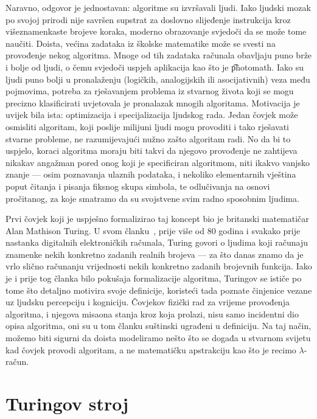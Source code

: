 Naravno, odgovor je jednostavan: algoritme su izvršavali ljudi. Iako ljudski mozak po svojoj prirodi nije savršen supstrat za doslovno slijeđenje instrukcija kroz višeznamenkaste brojeve koraka, moderno obrazovanje svjedoči da se može tome na\-u\-či\-ti. Doista, većina zadataka iz školske matematike može se svesti na provođenje nekog algoritma. Mnoge od tih zadataka računala obavljaju puno brže i bolje od ljudi, o čemu svjedoči uspjeh aplikacija kao što je \t{photomath}. Iako su ljudi puno bolji u pronalaženju (logičkih, analogijskih ili asocijativnih) veza među pojmovima, potreba za rješavanjem problema iz stvarnog života koji se mogu precizno klasificirati uvjetovala je pronalazak mnogih algoritama. Motivacija je uvijek bila ista: optimizacija i specijalizacija ljudskog rada. Jedan čovjek može osmisliti algoritam, koji poslije milijuni ljudi mogu provoditi i tako rješavati stvarne probleme, ne razumijevajući nužno zašto algoritam radi. No da bi to uspjelo, koraci algoritma moraju biti takvi da njegovo provođenje ne zahtijeva nikakav angažman pored onog koji je specificiran algoritmom, niti ikakvo vanjsko znanje --- osim poznavanja ulaznih podataka, i nekoliko elementarnih vještina poput čitanja i pisanja fiksnog skupa simbola, te odlučivanja na osnovi pročitanog, za koje smatramo da su svojstvene svim radno sposobnim ljudima.

Prvi čovjek koji je uspješno formalizirao taj koncept bio je britanski matematičar Alan Mathison Turing. U svom članku~\cite{turing}, prije više od 80 godina i svakako prije nastanka digitalnih elektroničkih računala, Turing govori o ljudima koji računaju znamenke nekih konkretno zadanih realnih brojeva --- za što danas znamo da je vrlo slično računanju vrijednosti nekih konkretno zadanih brojevnih funkcija. Iako je i prije tog članka bilo pokušaja formalizacije algoritma, Turingov se ističe po tome što detaljno motivira svoje definicije, koristeći tada poznate činjenice vezane uz ljudsku percepciju i kogniciju. Čovjekov fizički rad za vrijeme provođenja algoritma, i njegova misaona stanja kroz koja prolazi, nisu samo incidentni dio opisa algoritma, oni su u tom članku suštinski ugrađeni u definiciju. Na taj način, možemo biti sigurni da doista modeliramo nešto što se događa u stvarnom svijetu kad čovjek provodi algoritam, a ne matematičku apstrakciju kao što je recimo $\lambda$-račun.

\section{Turingov stroj}

